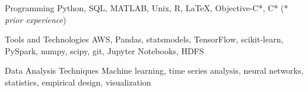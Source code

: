 

\begin{cvskills}

  \cvskill
    {Programming} %
    {Python, SQL, MATLAB, Unix, R, \LaTeX, Objective-C*, C* (* \textit{prior experience})} %

  \cvskill
    {Tools and Technologies} %
    {AWS, Pandas, statsmodels, TensorFlow, scikit-learn, PySpark, numpy, scipy, git, Jupyter Notebooks, HDFS} %

  \cvskill
    {Data Analysis Techniques} %
    {Machine learning, time series analysis, neural networks, statistics, empirical design, visualization} %

\end{cvskills}
